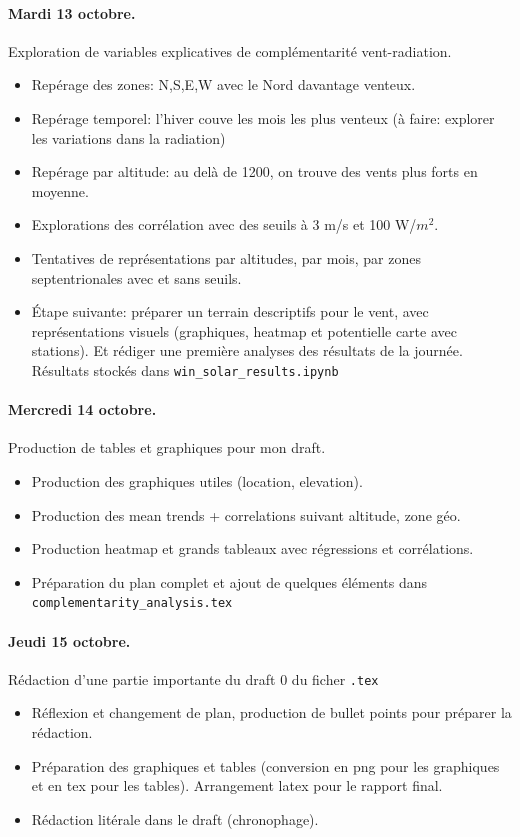 \documentclass[11pt, a4paper]{article}
\begin{document}
\paragraph{Mardi 13 octobre.} Exploration de variables explicatives de complémentarité vent-radiation.
\begin{itemize}
    \item Repérage des zones: N,S,E,W avec le Nord davantage venteux.
    \item Repérage temporel: l'hiver couve les mois les plus venteux (à faire: explorer les variations dans la radiation)
    \item Repérage par altitude: au delà de 1200, on trouve des vents plus forts en moyenne. 
    \item Explorations des corrélation avec des seuils à 3 m/s et 100 W/$m^2$.
    \item Tentatives de représentations par altitudes, par mois, par zones septentrionales avec et sans seuils. 
    \item Étape suivante: préparer un terrain descriptifs pour le vent, avec représentations visuels (graphiques, heatmap et potentielle carte avec stations). Et rédiger une première analyses des résultats de la journée. Résultats stockés dans \texttt{win\_solar\_results.ipynb}
\end{itemize}

\paragraph{Mercredi 14 octobre.} Production de tables et graphiques pour mon draft.
\begin{itemize}
    \item Production des graphiques utiles (location, elevation).
    \item Production des mean trends + correlations suivant altitude, zone géo.
    \item Production heatmap et grands tableaux avec régressions et corrélations.
    \item Préparation du plan complet et ajout de quelques éléments dans \texttt{complementarity\_analysis.tex}
\end{itemize}


\paragraph{Jeudi 15 octobre.} Rédaction d'une partie importante du draft 0 du ficher \texttt{.tex}
\begin{itemize}
    \item Réflexion et changement de plan, production de bullet points pour préparer la rédaction.
    \item Préparation des graphiques et tables (conversion en png pour les graphiques et en tex pour les tables). Arrangement latex pour le rapport final.
    \item Rédaction litérale dans le draft (chronophage).
\end{itemize}
\end{document}
